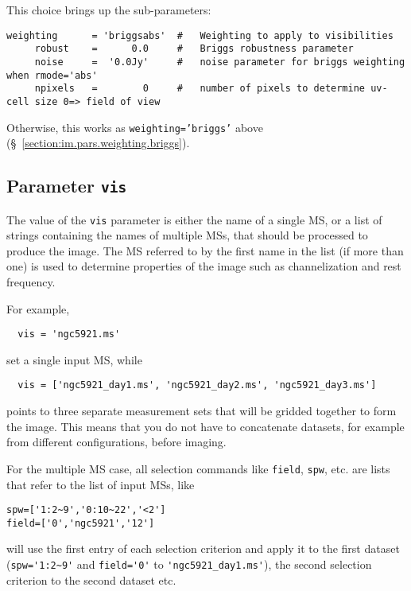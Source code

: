 This choice brings up the sub-parameters:
\small
\begin{verbatim}
weighting      = 'briggsabs'  #   Weighting to apply to visibilities 
     robust    =      0.0     #   Briggs robustness parameter
     noise     =  '0.0Jy'     #   noise parameter for briggs weighting when rmode='abs'
     npixels   =        0     #   number of pixels to determine uv-cell size 0=> field of view
\end{verbatim}
\normalsize

Otherwise, this works as {\tt weighting='briggs'} above 
(\S~\ref{section:im.pars.weighting.briggs}).

\subsection{Parameter {\tt vis} }
\label{section:im.pars.vis}


The value of the {\tt vis} parameter is either the name of a single
MS, or a list of strings containing the names of multiple MSs, that
should be processed to produce the image.  The MS referred to by the
first name in the list (if more than one) is used to determine
properties of the image such as channelization and rest frequency.

For example,
\small
\begin{verbatim}
  vis = 'ngc5921.ms'
\end{verbatim}
\normalsize
set a single input MS, while
\small
\begin{verbatim}
  vis = ['ngc5921_day1.ms', 'ngc5921_day2.ms', 'ngc5921_day3.ms']
\end{verbatim}
\normalsize points to three separate measurement sets that will be
gridded together to form the image.  This means that you do not have
to concatenate datasets, for example from different configurations,
before imaging. 

For the multiple MS case, all selection commands like {\tt field},
{\tt spw}, etc. are lists that refer to the list of input MSs,
like 

\small
\begin{verbatim}
spw=['1:2~9','0:10~22','<2']
field=['0','ngc5921','12']
\end{verbatim}
\normalsize

will use the first entry of each selection criterion and apply it to
the first dataset (\verb+spw='1:2~9'+ and \verb+field='0'+ to
\verb+'ngc5921_day1.ms'+), the second selection criterion to the
second dataset etc.

